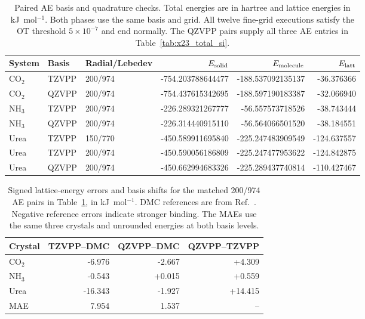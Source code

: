 \begin{table}[htbp]
\centering
\small
\caption{Paired AE basis and quadrature checks. Total energies are in hartree and lattice energies in kJ~mol$^{-1}$. Both phases use the same basis and grid. All twelve fine-grid executions satisfy the OT threshold $5\times10^{-7}$ and end normally. The QZVPP pairs supply all three AE entries in Table~\ref{tab:x23_total_si}.}
\label{tab:urea-basis}
\begin{tabular}{lllrrr}
\toprule
System & Basis & Radial/Lebedev & $E_{\rm solid}$ & $E_{\rm molecule}$ & $E_{\rm latt}$\\
\midrule
CO$_2$ & TZVPP & 200/974 & -754.203788644477 & -188.537092135137 & -36.376366\\
CO$_2$ & QZVPP & 200/974 & -754.437615342695 & -188.597190183387 & -32.066940\\
NH$_3$ & TZVPP & 200/974 & -226.289321267777 & -56.557573718526 & -38.743444\\
NH$_3$ & QZVPP & 200/974 & -226.314440915110 & -56.564066501520 & -38.184551\\
Urea & TZVPP & 150/770 & -450.589911695840 & -225.247483909549 & -124.637557\\
Urea & TZVPP & 200/974 & -450.590056186809 & -225.247477953622 & -124.842875\\
Urea & QZVPP & 200/974 & -450.662994683326 & -225.289437740814 & -110.427467\\
\bottomrule
\end{tabular}
\end{table}

\begin{table}[htbp]
\centering\small
\caption{Signed lattice-energy errors and basis shifts for the matched 200/974 AE pairs in Table~\ref{tab:urea-basis}, in kJ~mol$^{-1}$. DMC references are from Ref.~. Negative reference errors indicate stronger binding. The MAEs use the same three crystals and unrounded energies at both basis levels.}
\label{tab:crystal-basis-errors}
\begin{tabular}{lrrr}
\toprule
Crystal & TZVPP--DMC & QZVPP--DMC & QZVPP--TZVPP\\
\midrule
CO$_2$ & -6.976 & -2.667 & +4.309\\
NH$_3$ & -0.543 & +0.015 & +0.559\\
Urea & -16.343 & -1.927 & +14.415\\
\midrule
MAE & 7.954 & 1.537 & --\\
\bottomrule
\end{tabular}
\end{table}
